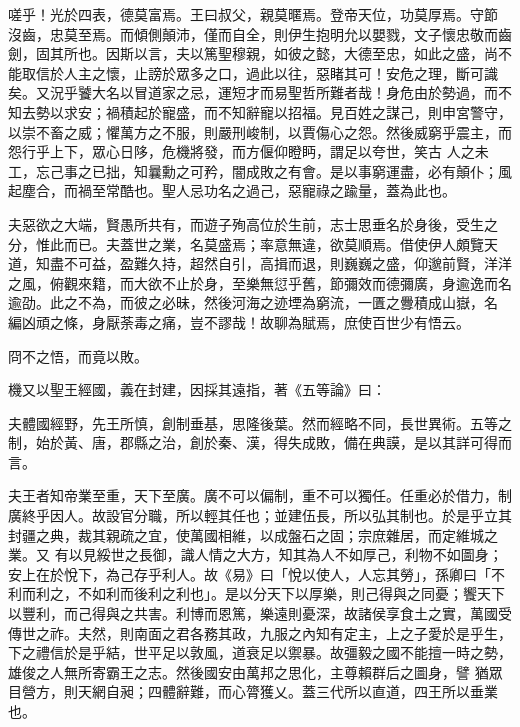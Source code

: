 \begin{pinyinscope}
 嗟乎！光於四表，德莫富焉。王曰叔父，親莫暱焉。登帝天位，功莫厚焉。守節
 沒齒，忠莫至焉。而傾側顛沛，僅而自全，則伊生抱明允以嬰戮，文子懷忠敬而齒劍，固其所也。因斯以言，夫以篤聖穆親，如彼之懿，大德至忠，如此之盛，尚不能取信於人主之懷，止謗於眾多之口，過此以往，惡睹其可！安危之理，斷可識矣。又況乎饕大名以冒道家之忌，運短才而易聖哲所難者哉！身危由於勢過，而不知去勢以求安；禍積起於寵盛，而不知辭寵以招福。見百姓之謀己，則申宮警守，以崇不畜之威；懼萬方之不服，則嚴刑峻制，以賈傷心之怨。然後威窮乎震主，而怨行乎上下，眾心日陊，危機將發，而方偃仰瞪眄，謂足以夸世，笑古
 人之未工，忘己事之已拙，知曩勳之可矜，闇成敗之有會。是以事窮運盡，必有顛仆；風起塵合，而禍至常酷也。聖人忌功名之過己，惡寵祿之踰量，蓋為此也。



 夫惡欲之大端，賢愚所共有，而遊子殉高位於生前，志士思垂名於身後，受生之分，惟此而已。夫蓋世之業，名莫盛焉；率意無違，欲莫順焉。借使伊人頗覽天道，知盡不可益，盈難久持，超然自引，高揖而退，則巍巍之盛，仰邈前賢，洋洋之風，俯觀來籍，而大欲不止於身，至樂無愆乎舊，節彌效而德彌廣，身逾逸而名逾劭。此之不為，而彼之必昧，然後河海之迹堙為窮流，一匱之釁積成山嶽，名
 編凶頑之條，身厭荼毒之痛，豈不謬哉！故聊為賦焉，庶使百世少有悟云。



 冏不之悟，而竟以敗。



 機又以聖王經國，義在封建，因採其遠指，著《五等論》曰：



 夫體國經野，先王所慎，創制垂基，思隆後葉。然而經略不同，長世異術。五等之制，始於黃、唐，郡縣之治，創於秦、漢，得失成敗，備在典謨，是以其詳可得而言。



 夫王者知帝業至重，天下至廣。廣不可以偏制，重不可以獨任。任重必於借力，制廣終乎因人。故設官分職，所以輕其任也；並建伍長，所以弘其制也。於是乎立其封疆之典，裁其親疏之宜，使萬國相維，以成盤石之固；宗庶雜居，而定維城之業。又
 有以見綏世之長御，識人情之大方，知其為人不如厚己，利物不如圖身；安上在於悅下，為己存乎利人。故《易》曰「悅以使人，人忘其勞」，孫卿曰「不利而利之，不如利而後利之利也」。是以分天下以厚樂，則己得與之同憂；饗天下以豐利，而己得與之共害。利博而恩篤，樂遠則憂深，故諸侯享食土之實，萬國受傳世之祚。夫然，則南面之君各務其政，九服之內知有定主，上之子愛於是乎生，下之禮信於是乎結，世平足以敦風，道衰足以禦暴。故彊毅之國不能擅一時之勢，雄俊之人無所寄霸王之志。然後國安由萬邦之思化，主尊賴群后之圖身，譬
 猶眾目營方，則天網自昶；四體辭難，而心膂獲乂。蓋三代所以直道，四王所以垂業也。




\end{pinyinscope}
